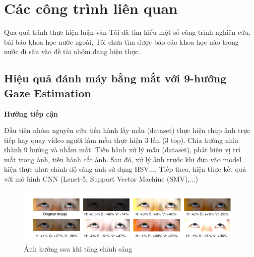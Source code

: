 \chapter{Các công trình liên quan}


Qua quá trình thực hiện luận văn Tôi đã tìm hiểu một số công trình nghiên cứu, bài báo khoa học nước ngoài, Tôi chưa tìm được báo cáo khoa học nào trong nước đi sâu vào đề tài nhóm đang hiện thực.

\section{Hiệu quả đánh máy bằng mắt với 9-hướng Gaze Estimation
 \cite{9direction}}
\textbf{Hướng tiếp cận}

Đầu tiên nhóm nguyên cứu tiến hành lấy mẫu (dataset) thực hiện chụp ảnh trực tiếp hay quay video người làm mẫu thực hiện 3 lần (3 top). Chia hướng nhìn thành 9 hướng và nhắm mắt. Tiến hành xử lý mẫu (dataset), phát hiện vị trí mắt trong ảnh, tiến hành cắt ảnh. Sau đó, xử lý ảnh trước khi đưa vào model hiện thực như: chỉnh độ sáng ảnh sử dụng HSV,... Tiếp theo, hiện thực kết quả với mô hình CNN (Lenet-5, Support Vector Machine (SMV),...)

\begin{center}
    \begin{figure}[h!]
    \begin{center}
     \includegraphics[scale=0.5]{img/yey.png}
    \end{center}
    \caption{Ảnh hưởng sau khi tăng chỉnh sáng}
    \label{refhinh15}
    \end{figure}
\end{center}

